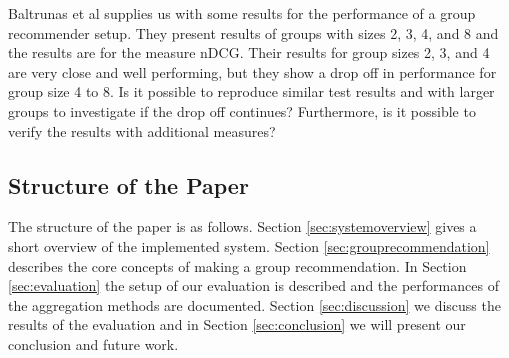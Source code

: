 
Baltrunas et al supplies us with some results for the performance of a group recommender setup. They present results of groups with sizes 2, 3, 4, and 8 and the results are for the measure nDCG. Their results for group sizes 2, 3, and 4 are very close and well performing, but they show a drop off in performance for group size 4 to 8. Is it possible to reproduce similar test results and with larger groups to investigate if the drop off continues? Furthermore, is it possible to verify the results with additional measures?


\subsection{Structure of the Paper}
The structure of the paper is as follows. Section \ref{sec:systemoverview} gives a short overview of the implemented system. Section \ref{sec:grouprecommendation} describes the core concepts of making a group recommendation. In Section \ref{sec:evaluation} the setup of our evaluation is described and the performances of the aggregation methods are documented. Section \ref{sec:discussion} we discuss the results of the evaluation and in Section \ref{sec:conclusion} we will present our conclusion and future work.